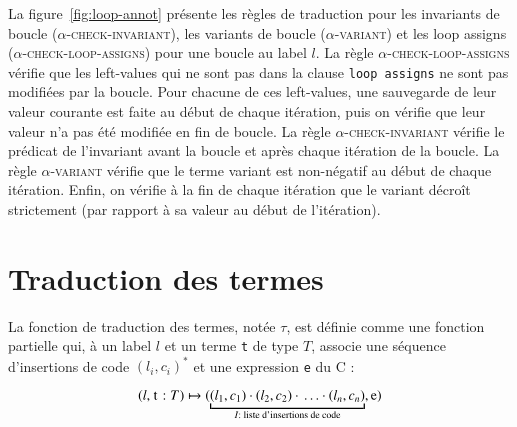 La figure~\ref{fig:loop-annot} présente les règles de traduction pour les
invariants de boucle (\textsc{$\alpha$-check-invariant}), les variants de boucle
(\textsc{$\alpha$-variant}) et les loop assigns
(\textsc{$\alpha$-check-loop-assigns}) pour une boucle au label $l$.
La règle \textsc{$\alpha$-check-loop-assigns} vérifie que les left-values qui ne
sont pas dans la clause \lstinline'loop assigns' ne sont pas modifiées par la
boucle.
Pour chacune de ces left-values, une sauvegarde de leur valeur courante est
faite au début de chaque itération, puis on vérifie que leur valeur n'a pas été
modifiée en fin de boucle.
La règle \textsc{$\alpha$-check-invariant} vérifie le prédicat de l'invariant
avant la boucle et après chaque itération de la boucle.
La règle \textsc{$\alpha$-variant} vérifie que le terme variant est non-négatif
au début de chaque itération.
Enfin, on vérifie à la fin de chaque itération que le variant décroît
strictement (par rapport à sa valeur au début de l'itération).



\section{Traduction des termes \eacsl}
\label{sec:term}



La fonction de traduction des termes, notée $\tau$, est définie comme une
fonction partielle qui, à un label $l$ et un terme \lstinline't' de type $T$,
associe une séquence d'insertions de code $(l_i, c_i)^*$ et une expression
\lstinline'e' du C :

\[
(l, \mbox{\lstinline't'}:T) \rulearrow
(\underbracket{(l_1, c_1) \concat (l_2, c_2) \concat \ldots
  \concat (l_n, c_n)}_{I : \text{ liste d'insertions de code}}, \mbox{\lstinline'e'})
\]

